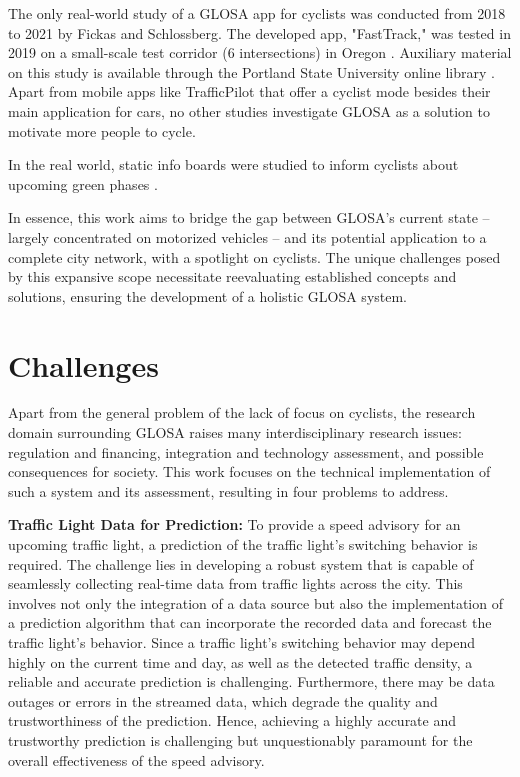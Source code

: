 The only real-world study of a GLOSA app for cyclists was conducted from 2018 to 2021 by Fickas and Schlossberg. The developed app, "FastTrack," was tested in 2019 on a small-scale test corridor (6 intersections) in Oregon \cite{fickas_fast_2019}. Auxiliary material on this study is available through the Portland State University online library \cite{fickas_green_2021, fickas_using_2021, fickas_riding_2019, fickas_data_2021, fickas_project_2018}. Apart from mobile apps like TrafficPilot that offer a cyclist mode besides their main application for cars, no other studies investigate GLOSA as a solution to motivate more people to cycle.

In the real world, static info boards were studied to inform cyclists about upcoming green phases \cite{lu_enhancement_2018}. 

In essence, this work aims to bridge the gap between GLOSA's current state -- largely concentrated on motorized vehicles -- and its potential application to a complete city network, with a spotlight on cyclists. The unique challenges posed by this expansive scope necessitate reevaluating established concepts and solutions, ensuring the development of a holistic GLOSA system.

\section{Challenges}

Apart from the general problem of the lack of focus on cyclists, the research domain surrounding GLOSA raises many interdisciplinary research issues: regulation and financing, integration and technology assessment, and possible consequences for society. This work focuses on the technical implementation of such a system and its assessment, resulting in four problems to address.

\textbf{\color{cidarkblue}Traffic Light Data for Prediction:} To provide a speed advisory for an upcoming traffic light, a prediction of the traffic light's switching behavior is required. The challenge lies in developing a robust system that is capable of seamlessly collecting real-time data from traffic lights across the city. This involves not only the integration of a data source but also the implementation of a prediction algorithm that can incorporate the recorded data and forecast the traffic light's behavior. Since a traffic light's switching behavior may depend highly on the current time and day, as well as the detected traffic density, a reliable and accurate prediction is challenging. Furthermore, there may be data outages or errors in the streamed data, which degrade the quality and trustworthiness of the prediction. Hence, achieving a highly accurate and trustworthy prediction is challenging but unquestionably paramount for the overall effectiveness of the speed advisory.

